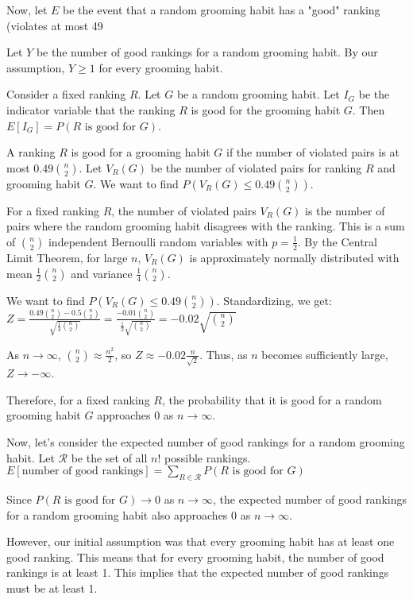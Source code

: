 \begin{enumerate}
\begin{shaded}
Now, let $E$ be the event that a random grooming habit has a "good" ranking (violates at most 49%

Let $Y$ be the number of good rankings for a random grooming habit. By our assumption, $Y \ge 1$ for every grooming habit.

Consider a fixed ranking $R$. Let $G$ be a random grooming habit. Let $I_G$ be the indicator variable that the ranking $R$ is good for the grooming habit $G$. Then $E[I_G] = P(R \text{ is good for } G)$.

A ranking $R$ is good for a grooming habit $G$ if the number of violated pairs is at most $0.49 \binom{n}{2}$. Let $V_R(G)$ be the number of violated pairs for ranking $R$ and grooming habit $G$. We want to find $P(V_R(G) \le 0.49 \binom{n}{2})$.

For a fixed ranking $R$, the number of violated pairs $V_R(G)$ is the number of pairs where the random grooming habit disagrees with the ranking. This is a sum of $\binom{n}{2}$ independent Bernoulli random variables with $p = \frac{1}{2}$. By the Central Limit Theorem, for large $n$, $V_R(G)$ is approximately normally distributed with mean $\frac{1}{2} \binom{n}{2}$ and variance $\frac{1}{4} \binom{n}{2}$.

We want to find $P(V_R(G) \le 0.49 \binom{n}{2})$. Standardizing, we get:
$Z = \frac{0.49 \binom{n}{2} - 0.5 \binom{n}{2}}{\sqrt{\frac{1}{4} \binom{n}{2}}} = \frac{-0.01 \binom{n}{2}}{\frac{1}{2} \sqrt{\binom{n}{2}}} = -0.02 \sqrt{\binom{n}{2}}$

As $n \to \infty$, $\binom{n}{2} \approx \frac{n^2}{2}$, so $Z \approx -0.02 \frac{n}{\sqrt{2}}$. Thus, as $n$ becomes sufficiently large, $Z \to -\infty$.

Therefore, for a fixed ranking $R$, the probability that it is good for a random grooming habit $G$ approaches 0 as $n \to \infty$.

Now, let's consider the expected number of good rankings for a random grooming habit. Let $\mathcal{R}$ be the set of all $n!$ possible rankings.
$E[\text{number of good rankings}] = \sum_{R \in \mathcal{R}} P(R \text{ is good for } G)$

Since $P(R \text{ is good for } G) \to 0$ as $n \to \infty$, the expected number of good rankings for a random grooming habit also approaches 0 as $n \to \infty$.

However, our initial assumption was that every grooming habit has at least one good ranking. This means that for every grooming habit, the number of good rankings is at least 1. This implies that the expected number of good rankings must be at least 1.


\end{shaded}
\end{enumerate}
